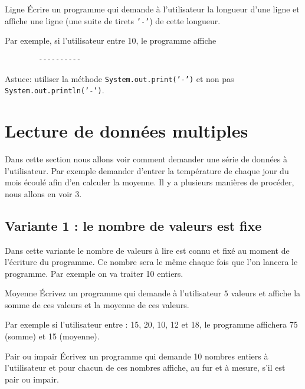 \documentclass[a4paper,11pt]{style-esi/td}
\begin{document}
	\begin{Exercice}{Ligne}	
		\'Ecrire un programme qui demande à l'utilisateur 
		la longueur d'une ligne et affiche une ligne (une suite de tirets \texttt{'-'}) de cette longueur.
		
		Par exemple, si l'utilisateur entre 10, le programme affiche
		
		\begin{verbatim}
		----------
		\end{verbatim}
		
		Astuce: utiliser la méthode \texttt{System.out.print('-')} et non pas \texttt{System.out.println('-')}.
	\end{Exercice}
 
 \section{Lecture de données multiples}
 
 	Dans cette section nous allons voir comment demander une série de données à l'utilisateur.
	Par exemple demander d'entrer la température de chaque jour du mois écoulé afin d'en calculer la moyenne.
	Il y a plusieurs manières de procéder, nous allons en voir 3.

	\subsection{Variante 1 : le nombre de valeurs est fixe}

		Dans cette variante le nombre de valeurs à lire est connu et fixé au moment de l'écriture du 
		programme. Ce nombre sera le même chaque fois que l'on
		lancera le programme.
		Par exemple on va traiter 10 entiers. 	
			

		\begin{Exercice}{Moyenne}\label{ex:moyenne}%
			\'Ecrivez un programme qui demande à l'utilisateur $5$ valeurs
			 et affiche la somme de ces valeurs et la moyenne de ces valeurs.
			 
			 Par exemple si l'utilisateur entre : 15, 20, 10, 12 et 18, 
			 le programme affichera 75 (somme) et 15 (moyenne).
		\end{Exercice}

		\begin{Exercice}{Pair ou impair}\label{ex:pair}%
			\'Ecrivez un programme qui demande 10 nombres entiers à l'utilisateur et 
			pour chacun de ces nombres affiche, au fur et à mesure, s'il est pair ou impair. 
		\end{Exercice}
	
\end{document}
